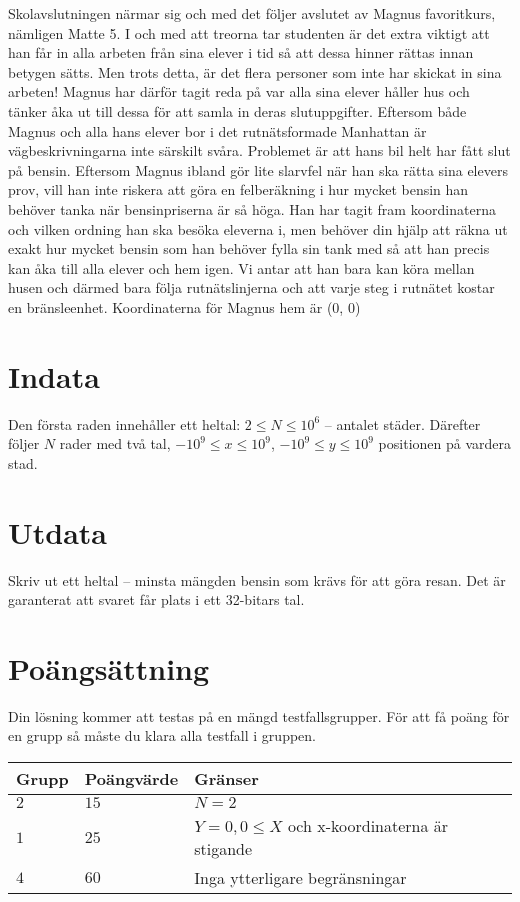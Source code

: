 Skolavslutningen närmar sig och med det följer avslutet av Magnus favoritkurs, nämligen Matte 5. 
I och med att treorna tar studenten är det extra viktigt att han får in alla arbeten från sina elever i tid så att dessa hinner rättas innan betygen sätts.
Men trots detta, är det flera personer som inte har skickat in sina arbeten! Magnus har därför tagit reda på var alla sina elever håller hus och tänker åka ut till dessa för att samla in deras slutuppgifter.
Eftersom både Magnus och alla hans elever bor i det rutnätsformade Manhattan är vägbeskrivningarna inte särskilt svåra. Problemet är att hans bil helt har fått slut på bensin.
Eftersom Magnus ibland gör lite slarvfel när han ska rätta sina elevers prov, vill han inte riskera att göra en felberäkning i hur mycket bensin han behöver tanka när bensinpriserna är så höga.
Han har tagit fram koordinaterna och vilken ordning han ska besöka eleverna i, men behöver din hjälp att räkna ut exakt hur mycket bensin som han behöver fylla sin tank med så att han precis kan åka till alla elever och hem igen.
Vi antar att han bara kan köra mellan husen och därmed bara följa rutnätslinjerna och att varje steg i rutnätet kostar en bränsleenhet.
Koordinaterna för Magnus hem är (0, 0)

\section*{Indata}
Den första raden innehåller ett heltal: $2\leq N \leq 10^6$ -- antalet städer. 
Därefter följer $N$ rader med två tal, $-10^9 \leq x \leq 10^9$, $-10^9 \leq y \leq 10^9$ positionen på vardera stad.


\section*{Utdata}
Skriv ut ett heltal -- minsta mängden bensin som krävs för att göra resan. Det är garanterat att svaret får plats i ett 32-bitars tal.

\section*{Poängsättning}
Din lösning kommer att testas på en mängd testfallsgrupper.
För att få poäng för en grupp så måste du klara alla testfall i gruppen.

\noindent
\begin{tabular}{| l | l | p{12cm} |}
  \hline
  Grupp & Poängvärde & Gränser \\ \hline
  $2$   & $15$       & $N=2$ \\ \hline
  $1$   & $25$       & $Y=0, 0 \leq X$ och x-koordinaterna är stigande \\ \hline
  $4$   & $60$       & Inga ytterligare begränsningar  \\ \hline
\end{tabular}

